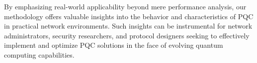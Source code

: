 \documentclass[10pt,journal]{IEEEtran}%
\begin{document}

By emphasizing real-world applicability beyond mere performance analysis, our methodology offers valuable insights into the behavior and characteristics of PQC in practical network environments. Such insights can be instrumental for network administrators, security researchers, and protocol designers seeking to effectively implement and optimize PQC solutions in the face of evolving quantum computing capabilities.













\end{document}
